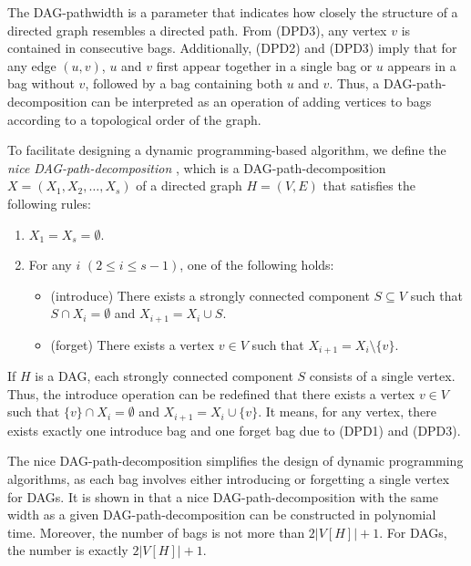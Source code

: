 \documentclass[runningheads]{llncs}
\theoremstyle{plain}
\theoremstyle{definition}
\begin{document}
The DAG-pathwidth is a parameter that indicates how closely the structure of a directed graph resembles a directed path. From (DPD3), any vertex $v$ is contained in consecutive bags. Additionally, (DPD2) and (DPD3) imply that for any edge $(u, v)$, $u$ and $v$ first appear together in a single bag or $u$ appears in a bag without $v$, followed by a bag containing both $u$ and $v$. Thus, a DAG-path-decomposition can be interpreted as an operation of adding vertices to bags according to a topological order of the graph.


To facilitate designing a dynamic programming-based algorithm, we define the \emph{nice DAG-path-decomposition} \cite{art12}, which is a DAG-path-decomposition $X = (X_1, X_2, \dots, X_s)$ of a directed graph $H = (V, E)$ that satisfies the following rules:
\begin{enumerate}
    \item $X_1 = X_s = \emptyset$.
    \item For any $i$ $(2 \leq i \leq s - 1)$, one of the following holds:
    \begin{itemize}
        \item (introduce) There exists a strongly connected component $S \subseteq V$ such that $S \cap X_i = \emptyset$ and $X_{i+1} = X_i \cup S$.
        \item (forget) There exists a vertex $v \in V$ such that $X_{i+1} = X_i \setminus \{v\}$.
    \end{itemize}
\end{enumerate}

If $H$ is a DAG, each strongly connected component $S$ consists of a single vertex. Thus, the introduce operation can be redefined that there exists a vertex $v \in V$ such that $\{v\} \cap X_i = \emptyset$ and $X_{i+1} = X_i \cup \{v\}$. It means, for any vertex, there exists exactly one introduce bag and one forget bag due to (DPD1) and (DPD3).

The nice DAG-path-decomposition simplifies the design of dynamic programming algorithms, as each bag involves either introducing or forgetting a single vertex for DAGs. It is shown in \cite{art12} that a nice DAG-path-decomposition with the same width as a given DAG-path-decomposition can be constructed in polynomial time. Moreover, the number of bags is not more than $2|V[H]| + 1$. For DAGs, the number is exactly $2|V[H]| + 1$.
\end{document}
